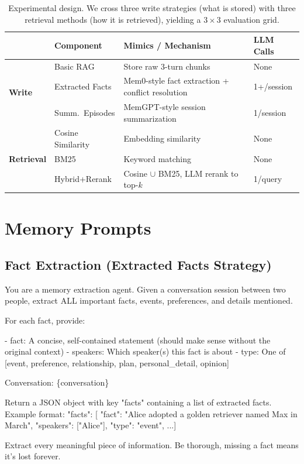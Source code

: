 \documentclass{article} %
\begin{document}
\begin{table}[H]
\caption{Experimental design. We cross three write strategies (what is stored) with three retrieval methods (how it is retrieved), yielding a $3 \times 3$ evaluation grid.}
\label{tab:design}
\begin{center}
\small
\vspace{0.5\baselineskip}
\begin{tabular}{llll}
\toprule
& \textbf{Component} & \textbf{Mimics / Mechanism} & \textbf{LLM Calls} \\
\midrule
\multirow{3}{*}{\textbf{Write}}
& Basic RAG & Store raw 3-turn chunks & None \\
& Extracted Facts & Mem0-style fact extraction + conflict resolution & 1+/session \\
& Summ.\ Episodes & MemGPT-style session summarization & 1/session \\
\midrule
\multirow{3}{*}{\textbf{Retrieval}}
& Cosine Similarity & Embedding similarity & None \\
& BM25 & Keyword matching & None \\
& Hybrid+Rerank & Cosine $\cup$ BM25, LLM rerank to top-$k$ & 1/query \\
\bottomrule
\end{tabular}
\vspace{0.5\baselineskip}
\end{center}
\end{table}

\section{Memory Prompts}
\label{app:memory-prompts}


\subsection{Fact Extraction (Extracted Facts Strategy)}

\begin{tcolorbox}[
  colback=gray!5!white,
  colframe=gray!75!black,
  title=Extraction Prompt,
  breakable
]
\small\ttfamily\raggedright
You are a memory extraction agent. Given a conversation session between two people, extract ALL important facts, events, preferences, and details mentioned.

For each fact, provide:

- fact: A concise, self-contained statement (should make sense without the original context)
- speakers: Which speaker(s) this fact is about
- type: One of [event, preference, relationship, plan, personal\_detail, opinion]

Conversation:
\{conversation\}

Return a JSON object with key "facts" containing a list of extracted facts.
Example format:
{"facts": 
  [
    {"fact": "Alice adopted a golden retriever named Max in March",
    "speakers": ["Alice"],
    "type": "event"}, 
    ...]
}


Extract every meaningful piece of information. Be thorough, missing a fact means it's lost forever.
\end{tcolorbox}
\end{document}
